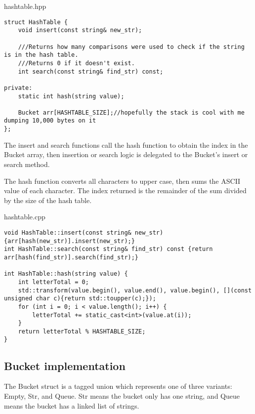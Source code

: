 \documentclass[letterpaper, 10pt,DIV=13]{scrartcl}
\numberwithin{equation}{section} %
\numberwithin{figure}{section} %
\numberwithin{table}{section} %
\begin{document}
hashtable.hpp
\begin{verbatim}
struct HashTable {
    void insert(const string& new_str);

    ///Returns how many comparisons were used to check if the string is in the hash table.
    ///Returns 0 if it doesn't exist.
    int search(const string& find_str) const;

private:
    static int hash(string value);

    Bucket arr[HASHTABLE_SIZE];//hopefully the stack is cool with me dumping 10,000 bytes on it
};
\end{verbatim}

The insert and search functions call the hash function to obtain the index in the Bucket array, then insertion
or search logic is delegated to the Bucket's insert or search method.

The hash function converts all characters to upper case, then sums the ASCII value of each character. The index
returned is the remainder of the sum divided by the size of the hash table.

hashtable.cpp
\begin{verbatim}
void HashTable::insert(const string& new_str) {arr[hash(new_str)].insert(new_str);}
int HashTable::search(const string& find_str) const {return arr[hash(find_str)].search(find_str);}

int HashTable::hash(string value) {
    int letterTotal = 0;
    std::transform(value.begin(), value.end(), value.begin(), [](const unsigned char c){return std::toupper(c);});
    for (int i = 0; i < value.length(); i++) {
        letterTotal += static_cast<int>(value.at(i));
    }
    return letterTotal % HASHTABLE_SIZE;
}
\end{verbatim}

\subsection{Bucket implementation}

The Bucket struct is a tagged union which represents one of three variants: Empty, Str, and Queue.
Str means the bucket only has one string, and Queue means the bucket has a linked list of strings.
\end{document}
